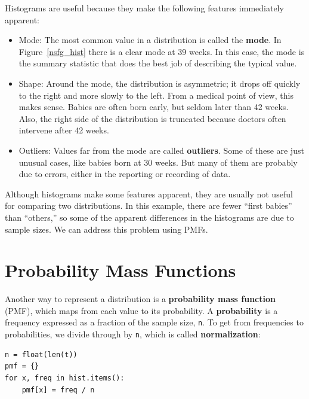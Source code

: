 \documentclass[12pt]{book}
\begin{document}
Histograms are useful because they make the following features immediately
apparent:

\begin{itemize}

\item Mode: The most common value in a distribution is called the
  {\bf mode}.  In Figure~\ref{nsfg_hist} there is a clear mode at 39
  weeks.  In this case, the mode is the summary statistic that does
  the best job of describing the typical value.

\item Shape: Around the mode, the distribution is asymmetric; it
  drops off quickly to the right and more slowly to the left.  From a
  medical point of view, this makes sense.  Babies are often born
  early, but seldom later than 42 weeks.  Also, the right side of the
  distribution is truncated because doctors often intervene after 42
  weeks.

\item Outliers: Values far from the mode are called {\bf outliers}.
  Some of these are just unusual cases, like babies born at 30 weeks.
  But many of them are probably due to errors, either in the reporting
  or recording of data.

\end{itemize}

Although histograms make some features apparent, they are usually not
useful for comparing two distributions.  In this example, there are
fewer ``first babies'' than ``others,'' so some of the apparent
differences in the histograms are due to sample sizes.  We can
address this problem using PMFs.


\section{Probability Mass Functions}


Another way to represent a distribution is a {\bf probability mass
  function} (PMF), which maps from each value to its probability.  A
{\bf probability} is a frequency expressed as a fraction of the sample
size, {\tt n}.  To get from frequencies to probabilities, we divide
through by {\tt n}, which is called {\bf normalization}:
%
\begin{verbatim}
n = float(len(t))
pmf = {}
for x, freq in hist.items():
    pmf[x] = freq / n
\end{verbatim}
\end{document}
